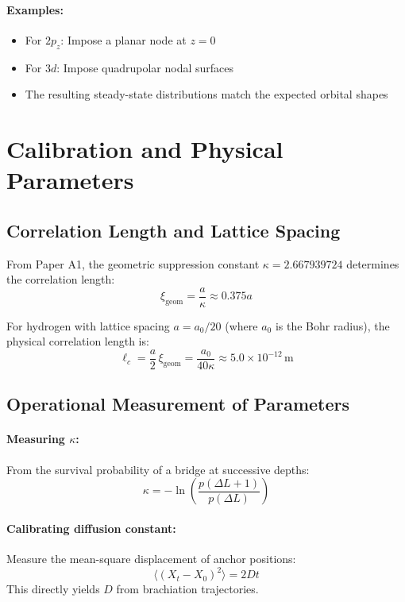 \documentclass[11pt]{article}
\theoremstyle{plain}
\theoremstyle{definition}
\begin{document}
\paragraph{Examples:}
\begin{itemize}
  \item For $2p_z$: Impose a planar node at $z=0$
  \item For $3d$: Impose quadrupolar nodal surfaces
  \item The resulting steady-state distributions match the expected orbital shapes
\end{itemize}

\section{Calibration and Physical Parameters}
\label{sec:calibration}

\subsection{Correlation Length and Lattice Spacing}

From Paper A1, the geometric suppression constant $\kappa = 2.667939724$ determines the correlation length:
\begin{equation}
  \xi_{\mathrm{geom}} = \frac{a}{\kappa} \approx 0.375a
\end{equation}

For hydrogen with lattice spacing $a = a_0/20$ (where $a_0$ is the Bohr radius), the physical correlation length is:
\begin{equation}
  \ell_c = \frac{a}{2}\,\xi_{\mathrm{geom}} = \frac{a_0}{40\kappa} \approx 5.0 \times 10^{-12}\,\text{m}
\end{equation}

\subsection{Operational Measurement of Parameters}

\paragraph{Measuring $\kappa$:}
From the survival probability of a bridge at successive depths:
\begin{equation}
  \kappa = -\ln\left(\frac{p(\Delta L+1)}{p(\Delta L)}\right)
\end{equation}

\paragraph{Calibrating diffusion constant:}
Measure the mean-square displacement of anchor positions:
\begin{equation}
  \langle (X_t - X_0)^2 \rangle = 2Dt
\end{equation}
This directly yields $D$ from brachiation trajectories.
\end{document}
